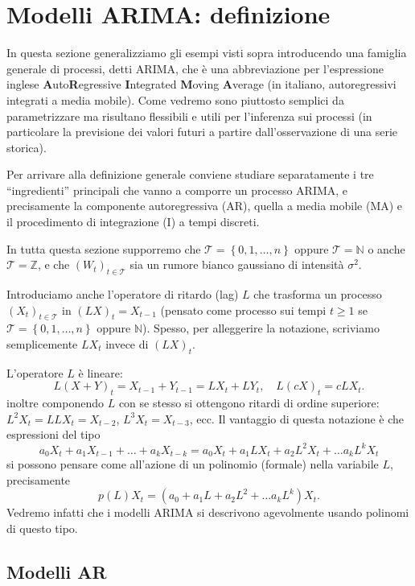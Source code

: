\documentclass[
  italian,
  letterpaper,
]{book}
\newcommand{\cur}[1]{\left\{ #1 \right\}}
\newcommand{\N}{\mathbb{N}}
\theoremstyle{definition}
\theoremstyle{remark}
\begin{document}
\section{Modelli ARIMA: definizione}\label{sec-arima-def}

In questa sezione generalizziamo gli esempi visti sopra introducendo una
famiglia generale di processi, detti ARIMA, che è una abbreviazione per
l'espressione inglese \textbf{A}uto\textbf{R}egressive
\textbf{I}ntegrated \textbf{M}oving \textbf{A}verage (in italiano,
autoregressivi integrati a media mobile). Come vedremo sono piuttosto
semplici da parametrizzare ma risultano flessibili e utili per
l'inferenza sui processi (in particolare la previsione dei valori futuri
a partire dall'osservazione di una serie storica).

Per arrivare alla definizione generale conviene studiare separatamente i
tre ``ingredienti'' principali che vanno a comporre un processo ARIMA, e
precisamente la componente autoregressiva (AR), quella a media mobile
(MA) e il procedimento di integrazione (I) a tempi discreti.

In tutta questa sezione supporremo che
\(\mathcal{T} = \cur{0,1, \ldots, n}\) oppure \(\mathcal{T} = \N\) o
anche \(\mathcal{T} = \mathbb{Z}\), e che \((W_t)_{t \in \mathcal{T}}\)
sia un rumore bianco gaussiano di intensità \(\sigma^2\).

Introduciamo anche l'operatore di ritardo (lag) \(L\) che trasforma un
processo \((X_t)_{t \in \mathcal{T}}\) in \((LX)_t = X_{t-1}\) (pensato
come processo sui tempi \(t \ge 1\) se
\(\mathcal{T} = \cur{0,1, \ldots, n}\) oppure \(\mathbb{N}\)). Spesso,
per alleggerire la notazione, scriviamo semplicemente \(LX_t\) invece di
\((LX)_t\).

L'operatore \(L\) è lineare:
\[ L(X+Y)_t = X_{t-1}+Y_{t-1} = LX_t + LY_t, \quad L(c X)_t = c LX_t.\]
inoltre componendo \(L\) con se stesso si ottengono ritardi di ordine
superiore: \(L^2X_t = LLX_t = X_{t-2}\), \(L^3X_t = X_{t-3}\), ecc. Il
vantaggio di questa notazione è che espressioni del tipo
\[ a_0 X_t + a_1 X_{t-1}+ \ldots +a_k X_{t-k} = a_0  X_t + a_1LX_t +a_2 L^2 X_t + \ldots a_k L^k X_t\]
si possono pensare come all'azione di un polinomio (formale) nella
variabile \(L\), precisamente
\[p(L) X_t  =  (a_0   + a_1L +a_2 L^2 + \ldots a_k L^k ) X_t.\] Vedremo
infatti che i modelli ARIMA si descrivono agevolmente usando polinomi di
questo tipo.

\subsection{Modelli AR}\label{modelli-ar}
\end{document}
